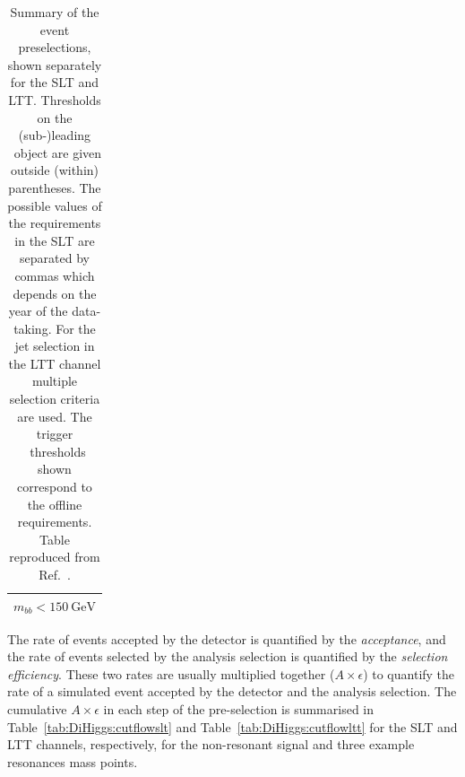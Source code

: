 \begin{table}[htbp]
{\begin{tabular}{C{0.39\textwidth}C{0.39\textwidth}}
   \\
    \bottomrule
    \end{tabular}
    }
    \caption{Summary of the event preselections, 
    shown separately for the SLT and LTT. 
   Thresholds on the (sub-)leading \pt\ object are given 
   outside (within) parentheses. 
   The possible values of the requirements in the SLT are separated by commas
   which depends on the year of the data-taking. 
   For the jet selection in the LTT channel multiple selection criteria are used.
   The trigger \pt\ thresholds shown correspond to the offline requirements.
   Table reproduced from Ref.~\cite{dihiggs-conf}.}
   \label{tab:DiHiggs:selectionsummary}
\end{table}


The rate of events accepted by the detector is quantified by the \textit{acceptance},
and the rate of events selected by the analysis selection is quantified by 
the \textit{selection efficiency}.
These two rates are usually multiplied together ($A \times \epsilon$) to quantify the rate of a simulated event
accepted by the detector and the analysis selection. 
The cumulative $A \times \epsilon$ in each step of the pre-selection
is summarised in Table~\ref{tab:DiHiggs:cutflowslt}
and Table~\ref{tab:DiHiggs:cutflowltt}
for the SLT and LTT channels, respectively, for the
non-resonant signal and three example resonances mass points.  



